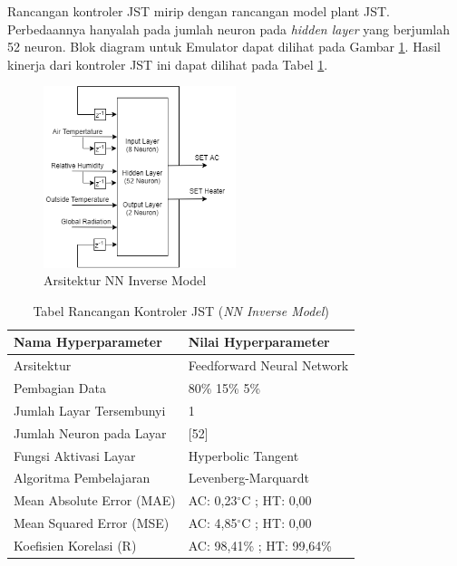 Rancangan kontroler JST mirip dengan rancangan model plant JST. Perbedaannya hanyalah pada jumlah neuron pada \textit{hidden layer} yang berjumlah 52 neuron. Blok diagram untuk Emulator dapat dilihat pada Gambar \ref{fig:5:NNInverseModelDesign}. Hasil kinerja dari kontroler JST ini dapat dilihat pada Tabel \ref{tbl:5:NNControler}.

\begin{figure}[!h]
	\centering
	\includegraphics[width=0.5\textwidth]{figures/NNInverseModelDesign}
	\caption{Arsitektur NN Inverse Model}
	\label{fig:5:NNInverseModelDesign}
\end{figure}

\begin{table}[!h]
	\caption{Tabel Rancangan Kontroler JST (\textit{NN Inverse Model})}
	\label{tbl:5:NNControler}
	\centering
	\begin{tabular}{|p{5.7cm}|p{5cm}|}
		\hline
		\textbf{Nama Hyperparameter} & \textbf{Nilai Hyperparameter} \\ \hline
		Arsitektur & Feedforward Neural Network \\ \hline
		Pembagian Data & 80\% 15\% 5\% \\ \hline 
		Jumlah Layar Tersembunyi & 1 \\ \hline
		Jumlah Neuron pada Layar & [52] \\ \hline
		Fungsi Aktivasi Layar & Hyperbolic Tangent \\ \hline
		Algoritma Pembelajaran & Levenberg-Marquardt \\ \hline
		Mean Absolute Error (MAE) & AC: 0,23$^\circ$C ; HT: 0,00 \\ \hline
		Mean Squared Error (MSE) & AC: 4,85$^\circ$C ; HT: 0,00 \\ \hline
		Koefisien Korelasi (R) & AC: 98,41\% ; HT: 99,64\% \\ \hline
	\end{tabular}
\end{table}

